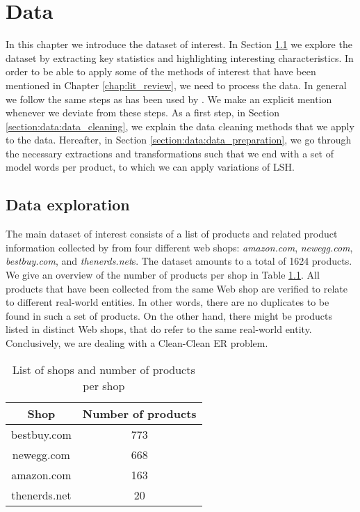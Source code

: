 \chapter{Data}
\label{chap:data}
In this chapter we introduce the dataset of interest. In Section \ref{section:data:data_exploration} we explore the dataset by extracting key statistics and highlighting interesting characteristics. In order to be able to apply some of the methods of interest that have been mentioned in Chapter \ref{chap:lit_review}, we need to process the data. In general we follow the same steps as has been used by \cite{HartveldKMNPFS18}. We make an explicit mention whenever we deviate from these steps. As a first step, in Section \ref{section:data:data_cleaning}, we explain the data cleaning methods that we apply to the data. Hereafter, in Section \ref{section:data:data_preparation}, we go through the necessary extractions and transformations such that we end with a set of model words per product, to which we can apply variations of LSH. 
\section{Data exploration}
\label{section:data:data_exploration}
The main dataset of interest consists of a list of products and related product information collected by \cite{DamGKNVF16} from four different web shops: \textit{amazon.com}, \textit{newegg.com}, \textit{bestbuy.com}, and \textit{thenerds.net}s. The dataset amounts to a total of 1624 products. We give an overview of the number of products per shop in Table \ref{table:no_products_per_shop}. All products that have been collected from the same Web shop are verified to relate to different real-world entities. In other words, there are no duplicates to be found in such a set of products. On the other hand, there might be products listed in distinct Web shops, that do refer to the same real-world entity. Conclusively, we are dealing with a Clean-Clean ER problem.
\begin{table}
    \centering
    \caption{List of shops and number of products per shop}
    \begin{tabular}{ |c|c| } 
     \hline
     Shop & Number of products \\ 
     \hline
     bestbuy.com & 773  \\ 
     \hline
     newegg.com & 668  \\ 
     \hline
     amazon.com &  163 \\ 
     \hline
     thenerds.net & 20  \\ 
     \hline
    \end{tabular}
\label{table:no_products_per_shop}
\end{table}


